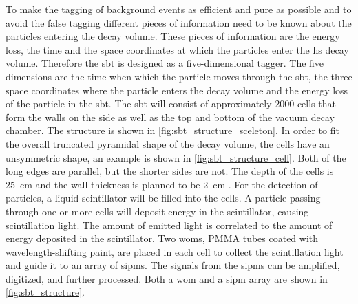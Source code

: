 To make the tagging of background events as efficient and pure as possible and to avoid the false tagging different pieces of information need to be known about the particles entering the decay volume.
These pieces of information are the energy loss, the time and the space coordinates at which the particles enter the \ac{hs} decay volume.
Therefore the \ac{sbt} is designed as a five-dimensional tagger.
The five dimensions are the time when which the particle moves through the \ac{sbt}, the three space coordinates where the particle enters the decay volume and the energy loss of the particle in the \ac{sbt}.
The \ac{sbt} will consist of approximately 2000 cells that form the walls on the side as well as the top and bottom of the vacuum decay chamber.
The structure is shown in \autoref{fig:sbt_structure_sceleton}.
In order to fit the overall truncated pyramidal shape of the decay volume, the cells have an unsymmetric shape, an example is shown in \autoref{fig:sbt_structure_cell}.
Both of the long edges are parallel, but the shorter sides are not.
The depth of the cells is \SI{25}{\centi\meter} and the wall thickness is planned to be \SI{2}{\centi\meter} \cite{strucural_design}.
For the detection of particles, a liquid scintillator will be filled into the cells.
A particle passing through one or more cells will deposit energy in the scintillator, causing scintillation light.
The amount of emitted light is correlated to the amount of energy deposited in the scintillator.
Two \acp{wom}, PMMA tubes coated with wavelength-shifting paint, are placed in each cell to collect the scintillation light and guide it to an array of \acp{sipm}.
The signals from the \acp{sipm} can be amplified, digitized, and further processed.
Both a \ac{wom} and a \ac{sipm} array are shown in \autoref{fig:sbt_structure}.
